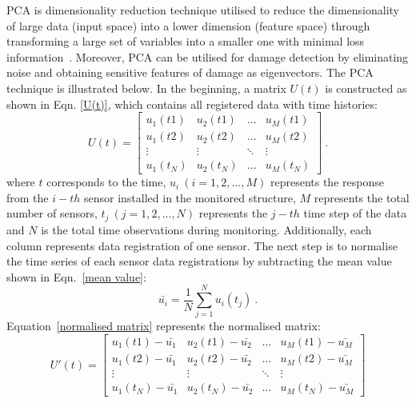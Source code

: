 PCA is dimensionality reduction technique utilised to reduce the dimensionality of large data (input space) into a lower dimension (feature space) through transforming a large set of variables into a smaller one with minimal loss information~\cite{Jolliffe2002}.
Moreover, PCA can be utilised for damage detection by eliminating noise and obtaining sensitive features of damage as eigenvectors.
The PCA technique is illustrated below.
In the beginning, a matrix \(U(t)\) is constructed as shown in Eqn. \ref{U(t)}, which contains all registered data with time histories:
\begin{equation}
	U(t)=
	\begin{bmatrix}
		u_1{(t1)}       & u_2{(t1)} & \dots & u_M{(t1)} \\
		u_1{(t2)}       & u_2{(t2)} & \dots & u_M{(t2)} \\
		\vdots 			& \vdots 	& \ddots & \vdots \\
		u_1{(t_N)}      & u_2{(t_N)} & \dots & u_M{(t_N)}
	\end{bmatrix}\ .
	\label{U(t)}
\end{equation}
where \(t\) corresponds to the time, \(u_i\ (i = 1, 2, ..., M)\) represents the response from the \(i-th\) sensor installed in the monitored structure, \(M\) represents the total number of sensors, \(t_j\ (j = 1, 2, ..., N)\) represents the \(j-th\) time step of the data and \(N\) is the total time observations during monitoring.
Additionally, each column represents data registration of one sensor.
The next step is to normalise the time series of each sensor data registrations by subtracting the mean value shown in Eqn.~\ref{mean value}:
\begin{equation}
	\bar{u_i} = \frac{1}{N}\sum_{j=1}^{N}u_i(t_j)\ .
	\label{mean value}
\end{equation}
Equation~\ref{normalised matrix} represents the normalised matrix:
\begin{equation}
	U'(t)=
	\begin{bmatrix}
		u_1{(t1)}-\bar{u_1}       & u_2{(t1)}-\bar{u_2} & \dots  & u_M{(t1)}-\bar{u_M} \\
		u_1{(t2)}-\bar{u_1}       & u_2{(t2)}-\bar{u_2} & \dots  & u_M{(t2)}-\bar{u_M} \\
		\vdots 					  & \vdots 	  			& \ddots & \vdots \\
		u_1{(t_N)}-\bar{u_1}      & u_2{(t_N)}-\bar{u_2}& \dots  & u_M{(t_N)}-\bar{u_M}
	\end{bmatrix}
	\label{normalised matrix}
\end{equation}
